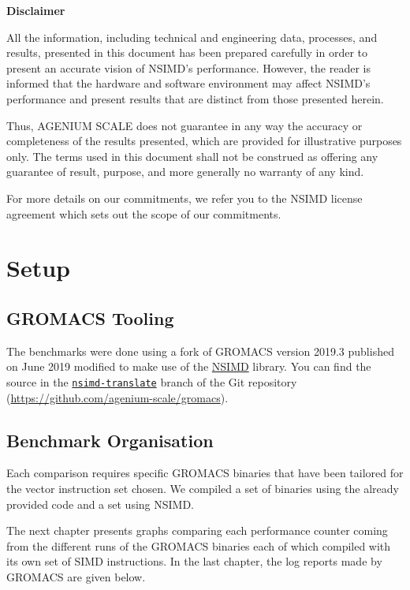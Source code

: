 \documentclass[a4paper,11pt]{article}
\newcommand{\gromacs}{GROMACS}
\newcommand{\nsimd}{NSIMD}
\newcommand{\ageniumscale}{AGENIUM SCALE}
\begin{document}
\begin{mdframed}{
  \textbf{Disclaimer}

  All the information, including technical and engineering data, processes,
  and results, presented in this document has been prepared carefully in
  order to present an accurate vision of NSIMD's performance. However, the
  reader is informed that the hardware and software environment may affect
  NSIMD's performance and present results that are distinct from those
  presented herein.

  Thus, \ageniumscale{} does not guarantee in any way the accuracy or
  completeness of the results presented, which are provided for illustrative
  purposes only. The terms used in this document shall not be construed as
  offering any guarantee of result, purpose, and more generally no warranty of
  any kind.

  For more details on our commitments, we refer you to the NSIMD license
  agreement which sets out the scope of our commitments.
}\end{mdframed}

\section{Setup}%
\label{sec:setup}

\subsection{\gromacs{} Tooling}

The benchmarks were done using a fork of \gromacs{} version 2019.3 published on
June 2019 modified to make use of the
\href{https://github.com/agenium-scale/nsimd#nsimd}{\nsimd{}} library. You can
find the source in the
\href{https://github.com/agenium-scale/gromacs/tree/nsimd-translate}
{\texttt{nsimd-translate}} branch of the Git repository
(\href{https://github.com/agenium-scale/gromacs}
{https://github.com/agenium-scale/gromacs}).

\subsection{Benchmark Organisation}

Each comparison requires specific \gromacs{} binaries that have been tailored
for the vector instruction set chosen. We compiled a set of binaries using the
already provided code and a set using \nsimd{}.

The next chapter presents graphs comparing each performance counter coming from
the different runs of the \gromacs{} binaries each of which compiled with its
own set of SIMD instructions.  In the last chapter, the log reports made by
\gromacs{} are given below.
\end{document}
